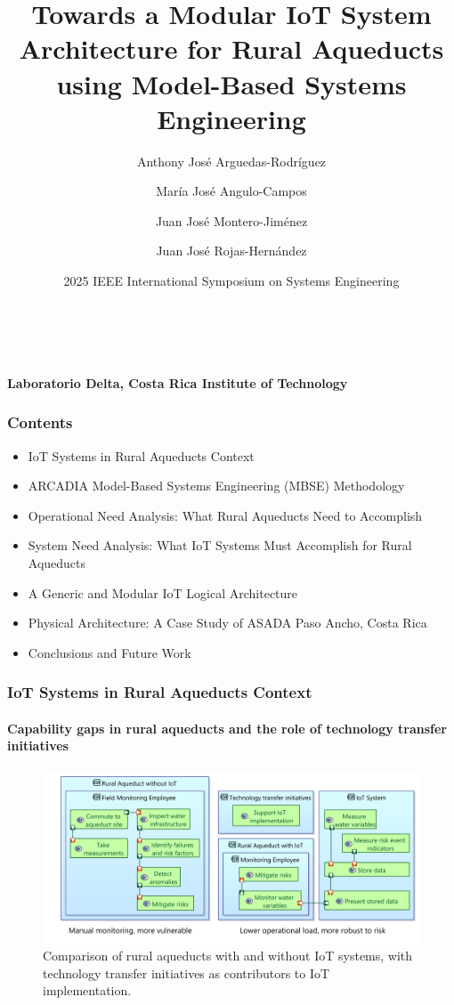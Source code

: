 \documentclass{beamer}
\title[IoT for Rural Aqueducts using MBSE]{Towards a Modular IoT System Architecture for Rural Aqueducts using Model-Based Systems Engineering}
\author[Laboratorio Delta]{Anthony José Arguedas-Rodríguez \and María José Angulo-Campos \and Juan José Montero-Jiménez \and Juan José Rojas-Hernández}
\date{2025 IEEE International Symposium on Systems Engineering}
\begin{document}
\begin{frame}
    \begin{center}
        {\LARGE \textbf{\inserttitle}} \\
        \vspace{0.5cm}
        {\insertauthor} \\
        \vspace{0.25cm}
        {\small \textbf{Laboratorio Delta, Costa Rica Institute of Technology}} \\
        \vspace{0.5cm}
        {\insertdate}
    \end{center}
\end{frame}

\begin{frame}
    \frametitle{Contents}
    \begin{itemize}
        \item IoT Systems in Rural Aqueducts Context
        \item ARCADIA Model-Based Systems Engineering (MBSE) Methodology
        \item Operational Need Analysis: What Rural Aqueducts Need to Accomplish
        \item System Need Analysis: What IoT Systems Must Accomplish for Rural Aqueducts
        \item A Generic and Modular IoT Logical Architecture
        \item Physical Architecture: A Case Study of ASADA Paso Ancho, Costa Rica
        \item Conclusions and Future Work
    \end{itemize}
\end{frame}

\begin{frame}
    \frametitle{\small IoT Systems in Rural Aqueducts Context}
    \framesubtitle{Capability gaps in rural aqueducts and the role of technology transfer initiatives}

    \begin{figure}
        \centering
        \includegraphics[width=\textwidth]{images/before_and_after_iot.png}
        \caption{Comparison of rural aqueducts with and without IoT systems, with technology transfer initiatives as contributors to IoT implementation.}
    \end{figure}
\end{frame}
\end{document}
